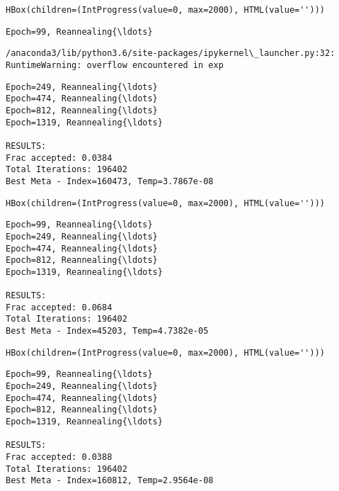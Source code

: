\documentclass[11pt]{article}
\begin{document}
    
    \begin{verbatim}
HBox(children=(IntProgress(value=0, max=2000), HTML(value='')))
    \end{verbatim}

    
    \begin{Verbatim}[commandchars=\\\{\}]
Epoch=99, Reannealing{\ldots}

    \end{Verbatim}

    \begin{Verbatim}[commandchars=\\\{\}]
/anaconda3/lib/python3.6/site-packages/ipykernel\_launcher.py:32: RuntimeWarning: overflow encountered in exp

    \end{Verbatim}

    \begin{Verbatim}[commandchars=\\\{\}]
Epoch=249, Reannealing{\ldots}
Epoch=474, Reannealing{\ldots}
Epoch=812, Reannealing{\ldots}
Epoch=1319, Reannealing{\ldots}

RESULTS:
Frac accepted: 0.0384
Total Iterations: 196402
Best Meta - Index=160473, Temp=3.7867e-08

    \end{Verbatim}

    
    \begin{verbatim}
HBox(children=(IntProgress(value=0, max=2000), HTML(value='')))
    \end{verbatim}

    
    \begin{Verbatim}[commandchars=\\\{\}]
Epoch=99, Reannealing{\ldots}
Epoch=249, Reannealing{\ldots}
Epoch=474, Reannealing{\ldots}
Epoch=812, Reannealing{\ldots}
Epoch=1319, Reannealing{\ldots}

RESULTS:
Frac accepted: 0.0684
Total Iterations: 196402
Best Meta - Index=45203, Temp=4.7382e-05

    \end{Verbatim}

    
    \begin{verbatim}
HBox(children=(IntProgress(value=0, max=2000), HTML(value='')))
    \end{verbatim}

    
    \begin{Verbatim}[commandchars=\\\{\}]
Epoch=99, Reannealing{\ldots}
Epoch=249, Reannealing{\ldots}
Epoch=474, Reannealing{\ldots}
Epoch=812, Reannealing{\ldots}
Epoch=1319, Reannealing{\ldots}

RESULTS:
Frac accepted: 0.0388
Total Iterations: 196402
Best Meta - Index=160812, Temp=2.9564e-08

    \end{Verbatim}
\end{document}
